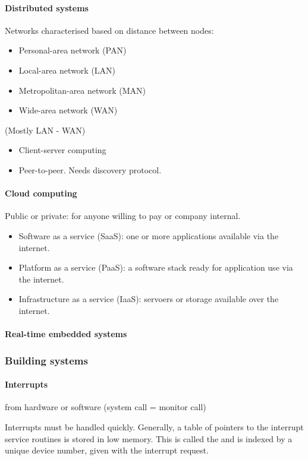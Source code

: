 \paragraph{Distributed systems} Networks characterised based on distance between nodes:
\begin{itemize}
\item Personal-area network (PAN)
\item Local-area network (LAN)
\item Metropolitan-area network (MAN)
\item Wide-area network (WAN)
\end{itemize}
(Mostly LAN - WAN)
\begin{itemize}
\item Client-server computing
\item Peer-to-peer. Needs discovery protocol.
\end{itemize}
\paragraph{Cloud computing} Public or private: for anyone willing to pay or company internal.
\begin{itemize}
\item Software as a service (SaaS): one or more applications available via the internet.
\item Platform as a service (PaaS): a software stack ready for application use via the internet.
\item Infrastructure as a service (IaaS): servoers or storage available over the internet.
\end{itemize}
\paragraph{Real-time embedded systems}

\subsubsection{Building systems}
\paragraph{Interrupts}
from hardware or software (system call = monitor call)

Interrupts must be handled quickly. Generally, a table of pointers to the interrupt service routines is stored in low memory. This is called the  and is indexed by a unique device number, given with the interrupt request.

